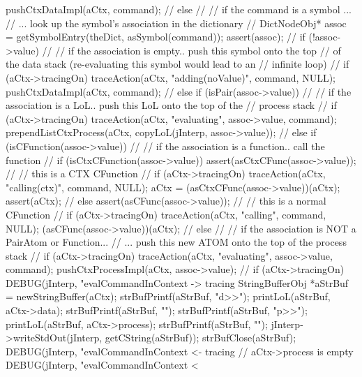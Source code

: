 {{{      pushCtxDataImpl(aCtx, command);
      //
    } else {
      //
      // if the command is a symbol ...
      //  ... look up the symbol's association in the dictionary
      //
      DictNodeObj* assoc = getSymbolEntry(theDict, asSymbol(command));
      assert(assoc);
      //
      if (!assoc->value) {
        //
        // if the association is empty.. push this symbol onto the top
        // of the data stack (re-evaluating this symbol would lead to an
        // infinite loop)
        //
        if (aCtx->tracingOn)
          traceAction(aCtx, "adding(noValue)", command, NULL);
        pushCtxDataImpl(aCtx, command);
        //
      } else if (isPair(assoc->value)) {
        //
        // if the association is a LoL.. push this LoL onto the top of the
        // process stack
        //
        if (aCtx->tracingOn)
          traceAction(aCtx, "evaluating", assoc->value, command);
        prependListCtxProcess(aCtx,
          copyLoL(jInterp, assoc->value));
        //
      } else if (isCFunction(assoc->value)) {
        //
        // if the association is a function.. call the function
        //
        if (isCtxCFunction(assoc->value)) {
          assert(asCtxCFunc(assoc->value));
          //
          // this is a CTX CFunction
          //
          if (aCtx->tracingOn) 
            traceAction(aCtx, "calling(ctx)", command, NULL);
          aCtx = (asCtxCFunc(assoc->value))(aCtx);
          assert(aCtx);
          //
        } else {
          assert(asCFunc(assoc->value));
          //
          // this is a normal CFunction
          //
          if (aCtx->tracingOn)
            traceAction(aCtx, "calling", command, NULL);
          (asCFunc(assoc->value))(aCtx);
          //
        }
      } else {
        //
        // if the association is NOT a PairAtom or Function...
        // ... push this new ATOM onto the top of the process stack
        //
        if (aCtx->tracingOn)
          traceAction(aCtx, "evaluating", assoc->value, command);
        pushCtxProcessImpl(aCtx, assoc->value);
        //
      }
    }
    if (aCtx->tracingOn) {
      DEBUG(jInterp, "evalCommandInContext -> tracing%
      StringBufferObj *aStrBuf = newStringBuffer(aCtx);
      strBufPrintf(aStrBuf, "d>>");
      printLoL(aStrBuf, aCtx->data);
      strBufPrintf(aStrBuf, "\n");
      strBufPrintf(aStrBuf, "p>>");
      printLoL(aStrBuf, aCtx->process);
      strBufPrintf(aStrBuf, "\n");
      jInterp->writeStdOut(jInterp, getCString(aStrBuf));
      strBufClose(aStrBuf);
      DEBUG(jInterp, "evalCommandInContext <- tracing%
    }
  } // aCtx->process is empty
  DEBUG(jInterp, "evalCommandInContext < %
}
\stopCCode


